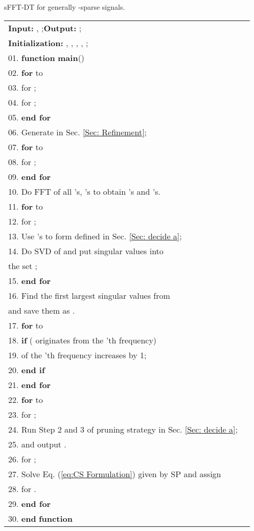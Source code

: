 \documentclass[journal,onecolumn,11pt]{IEEEtran}
\begin{document}
\begin{algorithm}[h]
\fontsize{11pt}{0.9em}\selectfont
\setlength{\abovecaptionskip}{0pt}
\setlength{\belowcaptionskip}{0pt}
\caption{sFFT-DT for generally -sparse signals.}
\label{Table:our algorithm for general K-sparse signal}
\begin{tabular}[t]{p{17.7cm}l}
\textbf{Input:} , ;\quad \textbf{Output:} ; \\
\textbf{Initialization:} , , , , ; \\
\hline\hline
01. \textbf{function} \textbf{main}()\\
02. \quad\textbf{for}  to  \\
03. \quad\quad  for ;\\
04. \quad\quad  for ;\\
05. \quad\textbf{end for}\\
06. \quad Generate  in Sec. \ref{Sec: Refinement};\\
07. \quad\textbf{for}  to  \\
08. \quad\quad  for ;\\
09. \quad\textbf{end for}\\
10. \quad Do FFT of all 's, 's to obtain 's and 's.\\
11. \quad \textbf{for}  to \\
12. \quad\quad \quad  for ; \\
13. \quad\quad \quad Use 's to form  defined in Sec. \ref{Sec: decide a}; \\
14. \quad\quad \quad Do SVD of  and put singular values into \\
\quad\quad\quad\quad \quad  the set ;    \\
15. \quad \textbf{end for} \\
16. \quad Find the first  largest singular values from \\
\quad\quad\quad  and save them as .\\
17. \quad \textbf{for}  to \\
18. \quad\quad \textbf{if} ( originates from the 'th frequency) \\
19. \quad \quad \quad  of the 'th frequency increases by 1;\\
20. \quad \quad \textbf{end if}\\
21. \quad \textbf{end for} \\
22. \quad \textbf{for}  to \\
23. \quad \quad  for ; \\
24. \quad \quad Run Step 2 and 3 of pruning strategy in Sec. \ref{Sec: decide a};\\
25. \quad \quad and output .\\
26. \quad \quad  for ; \\
27. \quad \quad Solve Eq. (\ref{eq:CS Formulation}) given  by SP and assign  \\
28. \quad \quad  for . \\
29. \quad \textbf{end for} \\
30. \textbf{end} \textbf{function}\\
\hline
\end{tabular}
\end{algorithm}
\renewcommand\arraystretch{1}
\end{document}

